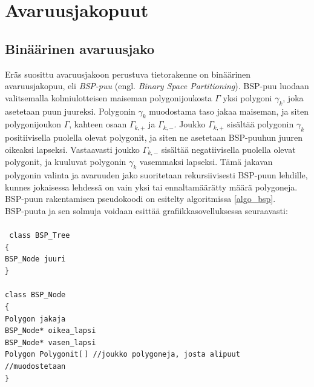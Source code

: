 \documentclass[a4paper, 12pt, titlepage]{article}
\newcommand{\tab}[1][0.5cm]{\hspace*{#1}} %
\newcommand{\code}[1]{\small\texttt{#1}} %
\begin{document}


\newpage
\section{Avaruusjakopuut}
\subsection{Binäärinen avaruusjako}

Eräs suosittu avaruusjakoon perustuva tietorakenne on binäärinen avaruusjakopuu, eli \emph{BSP-puu} (engl. \emph{Binary Space Partitioning}). BSP-puu luodaan valitsemalla kolmiulotteisen maiseman  polygonijoukosta $\Gamma$ yksi polygoni $\gamma_k$, joka asetetaan puun juureksi. Polygonin $\gamma_k$ muodostama taso jakaa maiseman, ja siten polygonijoukon $\Gamma$, kahteen osaan $\Gamma_{k,+}$ ja $\Gamma_{k,-}$. Joukko $\Gamma_{k,+}$ sisältää polygonin $\gamma_k$ positiivisella puolella olevat polygonit, ja siten ne asetetaan BSP-puuhun juuren oikeaksi lapseksi. Vastaavasti joukko $\Gamma_{k,-}$ sisältää negatiivisella puolella olevat polygonit, ja kuuluvat polygonin $\gamma_k$ vasemmaksi lapseksi. Tämä jakavan polygonin valinta ja avaruuden jako suoritetaan rekursiivisesti BSP-puun lehdille, kunnes jokaisessa lehdessä on vain yksi tai ennaltamäärätty määrä polygoneja. \citep[.]{samet} BSP-puun rakentamisen pseudokoodi on esitelty algoritmissa \ref{algo_bsp}.\\

BSP-puuta ja sen solmuja voidaan esittää grafiikkasovelluksessa seuraavasti:\\\\%
\code{
class BSP\_Tree\\
\{\\
\tab BSP\_Node juuri\\
\}\\\\
class BSP\_Node\\
\{\\
\tab Polygon jakaja\\
\tab BSP\_Node* oikea\_lapsi\\
\tab BSP\_Node* vasen\_lapsi\\
\tab Polygon Polygonit[$\,$] \tab //joukko polygoneja, josta alipuut\\ 
\hspace*{4.8cm} //muodostetaan\\
\}\\}
\end{document}
